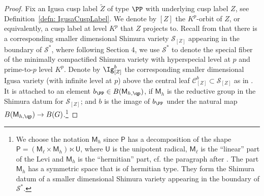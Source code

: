 \documentclass[letterpaper,11pt]{amsart}
\begin{document}
\begin{proof}
Fix an Igusa cusp label $\widetilde{Z}$ of type $\PP$ with underlying cusp label $Z$, see Definition~\ref{defn: IgusaCuspLabel}. We denote by $[Z]$ the $K^p$-orbit of $Z$, or equivalently, a cusp label at level $K^p$ that $Z$ projects to. Recall from \cite[Theorem 2.5.8]{CS2} that there is a corresponding smaller dimensional Shimura variety $\mathscr{S}_{[Z]}$ appearing in the boundary of $\mathscr{S}^\ast$, where following Section 4, we use $\mathscr{S}^\ast$ to denote the special fiber of the minimally compactified Shimura variety with hyperspecial level at $p$ and prime-to-$p$ level $K^p$. Denote by $\Ig^b_{[Z]}$ the corresponding smaller dimensional Igusa variety (with infinite level at $p$) above the central leaf $\mathscr{C}^b_{[Z]}\subset \mathscr{S}_{[Z]}$ as in \cite[Theorem 3.3.15]{CS2}. It is attached to an element $b_{\PP}\in B(\mathsf{M}_{h,\qp})$, if $\mathsf{M}_h$ is the reductive group in the Shimura datum for $\mathscr{S}_{[Z]}$; and $b$ is the image of $b_\PP$ under the natural map $B(\mathsf{M}_{h,\qp})\to B(G)$.\footnote{We choose the notation $\mathsf{M}_h$ since $\mathsf{P}$ has a decomposition of the shape $\mathsf{P}=(\mathsf{M}_\ell\times \mathsf{M}_h)\ltimes \mathsf{U}$, where $\mathsf{U}$ is the unipotent radical, $\mathsf{M}_\ell$ is the ``linear'' part of the Levi and $\mathsf{M}_h$ is the ``hermitian'' part, cf. the paragraph after \cite[Definition 3.3.8]{LanStroh}. The part $\mathsf{M}_h$ has a symmetric space that is of hermitian type. They form the Shimura datum of a smaller dimensional Shimura variety appearing in the boundary of $\mathscr{S}^\ast$.}


\end{proof}
\end{document}
